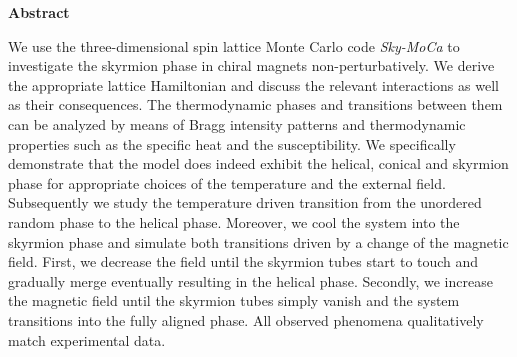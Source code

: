 %
\phantom{}
\bigskip
\bigskip
\bigskip
%
\begin{center}
{\sffamily \bfseries \huge Abstract}
\end{center}
%
\bigskip
\bigskip
%
We use the three-dimensional spin lattice Monte Carlo code \emph{Sky-MoCa} to
investigate the skyrmion phase in chiral magnets non-perturbatively. We derive
the appropriate lattice Hamiltonian and discuss the relevant interactions as
well as their consequences. The thermodynamic phases and transitions between
them can be analyzed by means of Bragg intensity patterns and thermodynamic
properties such as the specific heat and the susceptibility. We specifically
demonstrate that the model does indeed exhibit the helical, conical and skyrmion
phase for appropriate choices of the temperature and the external field.
Subsequently we study the temperature driven transition from the unordered
random phase to the helical phase. Moreover, we cool the system into the
skyrmion phase and simulate both transitions driven by a change of the magnetic
field. First, we decrease the field until the skyrmion tubes start to touch and
gradually merge eventually resulting in the helical phase. Secondly, we increase
the magnetic field until the skyrmion tubes simply vanish and the system
transitions into the fully aligned phase. All observed phenomena qualitatively
match experimental data.
